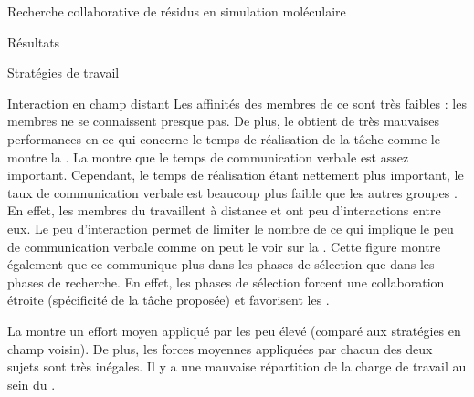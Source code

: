 \documentclass[myfrancais]{mythesis}
\begin{document}
\begin{mychapter}{Recherche collaborative de résidus en simulation moléculaire}
\begin{mysection}{Résultats}
\begin{mysubsection}{Stratégies de travail}
\begin{mysubsubsection}{Interaction en champ distant}
					Les affinités des membres de ce  sont très faibles  : les membres ne se connaissent presque pas.
					De plus, le  obtient de très mauvaises performances en ce qui concerne le temps de réalisation de la tâche comme le montre la .
					La  montre que le temps de communication verbale est assez important.
					Cependant, le temps de réalisation étant nettement plus important, le taux de communication verbale est beaucoup plus faible que les autres groupes .
					En effet, les membres du  travaillent à distance et ont peu d'interactions entre eux.
					Le peu d'interaction permet de limiter le nombre de  ce qui implique le peu de communication verbale comme on peut le voir sur la .
					Cette figure montre également que ce  communique plus dans les phases de sélection que dans les phases de recherche.
					En effet, les phases de sélection forcent une collaboration étroite (spécificité de la tâche proposée) et favorisent les .

					La  montre un effort moyen appliqué par les  peu élevé (comparé aux stratégies en champ voisin).
					De plus, les forces moyennes appliquées par chacun des deux sujets sont très inégales.
					Il y a une mauvaise répartition de la charge de travail au sein du .


\end{mysubsubsection}
\end{mysubsection}
\end{mysection}
\end{mychapter}
\end{document}
